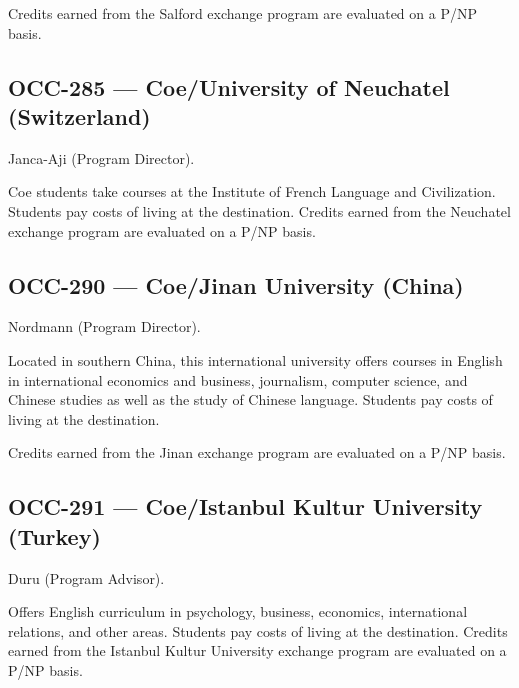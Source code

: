 \documentclass[
  letterpaper,
]{scrbook}
\renewcommand{\part}[1]{\addcontentsline{toc}{part}{#1}}
\begin{document}
Credits earned from the Salford exchange program are evaluated on a P/NP
basis.

\hypertarget{occ-285-coeuniversity-of-neuchatel-switzerland}{%
\subsection{OCC-285 --- Coe/University of Neuchatel
(Switzerland)}\label{occ-285-coeuniversity-of-neuchatel-switzerland}}

Janca-Aji (Program Director).

Coe students take courses at the Institute of French Language and
Civilization. Students pay costs of living at the destination. Credits
earned from the Neuchatel exchange program are evaluated on a P/NP
basis.

\hypertarget{occ-290-coejinan-university-china}{%
\subsection{OCC-290 --- Coe/Jinan University
(China)}\label{occ-290-coejinan-university-china}}

Nordmann (Program Director).

Located in southern China, this international university offers courses
in English in international economics and business, journalism, computer
science, and Chinese studies as well as the study of Chinese language.
Students pay costs of living at the destination.

Credits earned from the Jinan exchange program are evaluated on a P/NP
basis.

\hypertarget{occ-291-coeistanbul-kultur-university-turkey}{%
\subsection{OCC-291 --- Coe/Istanbul Kultur University
(Turkey)}\label{occ-291-coeistanbul-kultur-university-turkey}}

Duru (Program Advisor).

Offers English curriculum in psychology, business, economics,
international relations, and other areas. Students pay costs of living
at the destination. Credits earned from the Istanbul Kultur University
exchange program are evaluated on a P/NP basis.

\part{CAMPUS RESOURCES}
\end{document}

